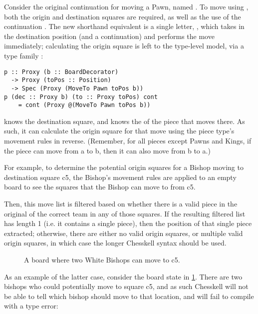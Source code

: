 Consider the original continuation for moving a Pawn, named . To move using , both the origin and destination squares are required, as well as the use of the continuation . The new shorthand equivalent is a single letter, , which takes in the destination position (and a continuation) and performs the move immediately; calculating the origin square is left to the type-level model, via a type family :

\begin{lstlisting}
p :: Proxy (b :: BoardDecorator)
  -> Proxy (toPos :: Position)
  -> Spec (Proxy (MoveTo Pawn toPos b))
p (dec :: Proxy b) (to :: Proxy toPos) cont
    = cont (Proxy @(MoveTo Pawn toPos b))
\end{lstlisting}

 knows the destination square, and knows the  of the piece that moves there. As such, it can calculate the origin square for that move using the piece type's movement rules in reverse. (Remember, for all pieces except Pawns and Kings, if the piece can move from a to b, then it can also move from b to a.)

For example, to determine the potential origin squares for a Bishop moving to destination square c5, the Bishop's movement rules are applied to an empty board to see the squares that the Bishop can move to from c5.


Then, this move list is filtered based on whether there is a valid piece in the original  of the correct team in any of those squares. If the resulting filtered list has length 1 (i.e. it contains a single piece), then the position of that single piece extracted; otherwise, there are either no valid origin squares, or multiple valid origin squares, in which case the longer Chesskell syntax should be used.

\begin{figure}
    \centering
    \showboard
    \caption{A board where two White Bishops can move to c5.}
    \label{twobishops}
\end{figure}

As an example of the latter case, consider the board state in \cref{twobishops}. There are two bishops who could potentially move to square c5, and as such Chesskell will not be able to tell which bishop should move to that location, and will fail to compile with a type error:

